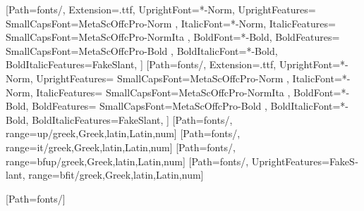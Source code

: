 
\usepackage[mathrm=sym, mathit=sym, mathsf=sym, mathbf=sym]{unicode-math}
\setmainfont{MetaOffcPro}[Path=fonts/,
Extension=.ttf,
UprightFont=*-Norm,
UprightFeatures={
	SmallCapsFont={MetaScOffcPro-Norm}
},
ItalicFont=*-Norm,
ItalicFeatures={
	SmallCapsFont={MetaScOffcPro-NormIta}
},
BoldFont=*-Bold,
BoldFeatures={
	SmallCapsFont={MetaScOffcPro-Bold}
},
BoldItalicFont=*-Bold,
BoldItalicFeatures={FakeSlant},
]
\setsansfont{MetaOffcPro}[Path=fonts/,
Extension=.ttf,
UprightFont=*-Norm,
UprightFeatures={
	SmallCapsFont={MetaScOffcPro-Norm}
},
ItalicFont=*-Norm,
ItalicFeatures={
	SmallCapsFont={MetaScOffcPro-NormIta}
},
BoldFont=*-Bold,
BoldFeatures={
	SmallCapsFont={MetaScOffcPro-Bold}
},
BoldItalicFont=*-Bold,
BoldItalicFeatures={FakeSlant},
]
[Path=fonts/,
range=up/{greek,Greek,latin,Latin,num}]
[Path=fonts/,
range=it/{greek,Greek,latin,Latin,num}]
[Path=fonts/,
range=bfup/{greek,Greek,latin,Latin,num}]
[Path=fonts/, UprightFeatures={FakeSlant},
range=bfit/{greek,Greek,latin,Latin,num}]

[Path=fonts/]


\usepackage{polyglossia}
\setmainlanguage{german}

\usepackage[pantone312]{wwustyle-mod}
\usepackage{selnolig}
\usepackage{microtype}

